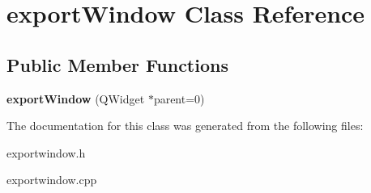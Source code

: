 \hypertarget{classexport_window}{\section{export\-Window \-Class \-Reference}
\label{classexport_window}
}
\subsection*{\-Public \-Member \-Functions}
\begin{DoxyCompactItemize}
\item 
\hypertarget{classexport_window_a79cc588aebbf4452d849e5b87d7582a2}{{\bfseries export\-Window} (\-Q\-Widget $\ast$parent=0)}\label{classexport_window_a79cc588aebbf4452d849e5b87d7582a2}

\end{DoxyCompactItemize}


\-The documentation for this class was generated from the following files\-:\begin{DoxyCompactItemize}
\item 
exportwindow.\-h\item 
exportwindow.\-cpp\end{DoxyCompactItemize}
